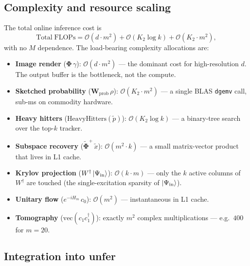 \documentclass[11pt, a4paper]{article}
\begin{document}
\subsection{Complexity and resource scaling}

The total online inference cost is
\begin{equation}
  \mathrm{Total\;FLOPs}=\mathcal{O}(d\cdot m^2)+\mathcal{O}(K_2\log k)
  +\mathcal{O}(K_2\cdot m^2),
\end{equation}
with no $M$ dependence. The load-bearing complexity allocations are:

\begin{itemize}
\item \textbf{Image render} ($\mathbf\Phi\,\gamma$): $\mathcal{O}(d\cdot m^2)$ ---
  the dominant cost for high-resolution $d$. The output buffer is the
  bottleneck, not the compute.
\item \textbf{Sketched probability} ($\mathbf{W}_{\mathrm{prob}}\,\rho$):
  $\mathcal{O}(K_2\cdot m^2)$ --- a single BLAS \texttt{dgemv} call, sub-ms
  on commodity hardware.
\item \textbf{Heavy hitters} ($\mathrm{HeavyHitters}(\tilde p)$):
  $\mathcal{O}(K_2\log k)$ --- a binary-tree search over the top-$k$ tracker.
\item \textbf{Subspace recovery} ($\tilde{\mathbf\Phi}^+\,\tilde x$):
  $\mathcal{O}(m^2\cdot k)$ --- a small matrix-vector product that lives in
  L1 cache.
\item \textbf{Krylov projection} ($W^\dagger\ket{\Psi_{\mathrm{in}}}$):
  $\mathcal{O}(k\cdot m)$ --- only the $k$ active columns of $W^\dagger$ are
  touched (the single-excitation sparsity of $\ket{\Psi_{\mathrm{in}}}$).
\item \textbf{Unitary flow} ($e^{-iH_m}\,c_0$): $\mathcal{O}(m^2)$ ---
  instantaneous in L1 cache.
\item \textbf{Tomography} ($\mathrm{vec}(c_1c_1^\dagger)$): exactly $m^2$
  complex multiplications --- e.g.\ $400$ for $m=20$.
\end{itemize}

\subsection{Integration into unfer}
\end{document}
